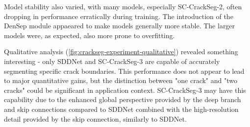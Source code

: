 \documentclass[a4paper,12pt]{report}
\begin{document}
Model stability also varied, with many models, especially SC-CrackSeg-2, often dropping in performance erratically during training. The introduction of the DenSep module appaeared to make models generally more stable. The larger models were, as expected, also more prone to overfitting.

Qualitative analysis (\autoref{fig:crackseg-experiment-qualitative}) revealed something interesting - only SDDNet and SC-CrackSeg-3 are capable of accurately segmenting specific crack boundaries. This performance does not appear to lead to major quantitative gains, but the distinction between "one crack" and "two cracks" could be significant in application context. SC-CrackSeg-3 may have this capability due to the enhanced global perspective provided by the deep branch and skip connections compared to SDDNet combined with the high-resolution detail provided by the skip connection, similarly to SDDNet.
\end{document}
